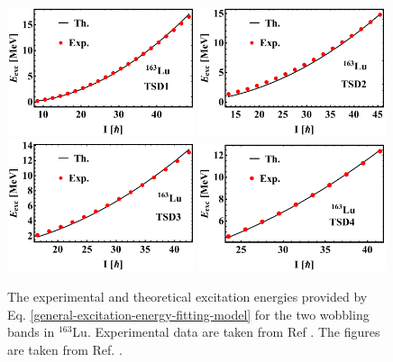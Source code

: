 \begin{figure}
    \centering
    \includegraphics[width=0.49\textwidth]{Chapters/Figures/Lu-exp-energies/fig3a_lu163.pdf}
    \includegraphics[width=0.49\textwidth]{Chapters/Figures/Lu-exp-energies/fig3b_lu163.pdf}
    \includegraphics[width=0.49\textwidth]{Chapters/Figures/Lu-exp-energies/fig3c_lu163.pdf}
    \includegraphics[width=0.49\textwidth]{Chapters/Figures/Lu-exp-energies/fig3d_lu163.pdf}
    \caption{The experimental and theoretical excitation energies provided by Eq. \ref{general-excitation-energy-fitting-model} for the two wobbling bands in $^{163}$Lu. Experimental data are taken from Ref \cite{reich2010nuclear}. The figures are taken from Ref. \cite{raduta2020approach}.}
    \label{excitation-energies-th-163Lu}
\end{figure}
